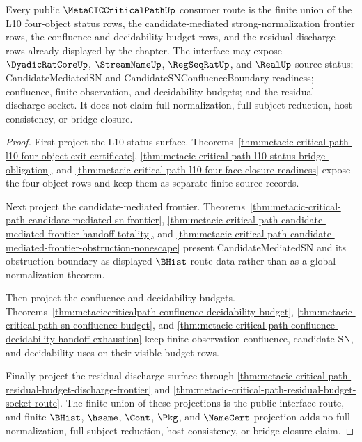 \begin{theorem}
\label{thm:metacic-critical-path-public-interface}
Every public $\MetaCICCriticalPathUp$ consumer route is the finite union of the L10 four-object status rows, the candidate-mediated strong-normalization frontier rows, the confluence and decidability budget rows, and the residual discharge rows already displayed by the chapter. The interface may expose $\DyadicRatCoreUp$, $\StreamNameUp$, $\RegSeqRatUp$, and $\RealUp$ source status; CandidateMediatedSN and CandidateSNConfluenceBoundary readiness; confluence, finite-observation, and decidability budgets; and the residual discharge socket. It does not claim full normalization, full subject reduction, host consistency, or bridge closure.
\end{theorem}
\begin{proof}
First project the L10 status surface. Theorems~\ref{thm:metacic-critical-path-l10-four-object-exit-certificate}, \ref{thm:metacic-critical-path-l10-status-bridge-obligation}, and \ref{thm:metacic-critical-path-l10-four-face-closure-readiness} expose the four object rows and keep them as separate finite source records.

Next project the candidate-mediated frontier. Theorems~\ref{thm:metacic-critical-path-candidate-mediated-sn-frontier}, \ref{thm:metacic-critical-path-candidate-mediated-frontier-handoff-totality}, and \ref{thm:metacic-critical-path-candidate-mediated-frontier-obstruction-nonescape} present CandidateMediatedSN and its obstruction boundary as displayed $\BHist$ route data rather than as a global normalization theorem.

Then project the confluence and decidability budgets. Theorems~\ref{thm:metaciccriticalpath-confluence-decidability-budget}, \ref{thm:metacic-critical-path-sn-confluence-budget}, and \ref{thm:metacic-critical-path-confluence-decidability-handoff-exhaustion} keep finite-observation confluence, candidate SN, and decidability uses on their visible budget rows.

Finally project the residual discharge surface through \autoref{thm:metacic-critical-path-residual-budget-discharge-frontier} and \autoref{thm:metacic-critical-path-residual-budget-socket-route}. The finite union of these projections is the public interface route, and finite $\BHist$, $\hsame$, $\Cont$, $\Pkg$, and $\NameCert$ projection adds no full normalization, full subject reduction, host consistency, or bridge closure claim.
\end{proof}

